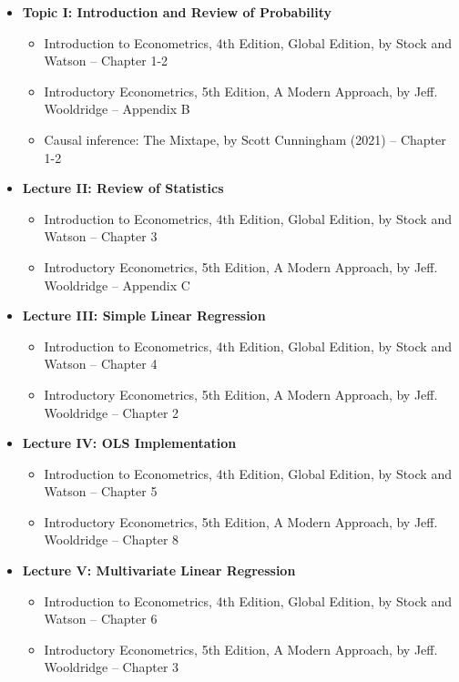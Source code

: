 \documentclass[12pt]{article}
\begin{document}
\begin{itemize}
    \item \textbf{Topic I: Introduction and Review of Probability}
    \begin{itemize}
        \item Introduction to Econometrics, 4th Edition, Global Edition, by Stock and Watson -- Chapter 1-2
        \item Introductory Econometrics, 5th Edition, A Modern Approach, by Jeff. Wooldridge -- Appendix B
        \item  Causal inference: The Mixtape, by Scott Cunningham (2021) -- Chapter 1-2

    \end{itemize}

    \item \textbf{Lecture II: Review of Statistics}
    \begin{itemize}
        \item Introduction to Econometrics, 4th Edition, Global Edition, by Stock and Watson -- Chapter 3
        \item Introductory Econometrics, 5th Edition, A Modern Approach, by Jeff. Wooldridge -- Appendix C\\[1em]
    \end{itemize}
    
    \item \textbf{Lecture III: Simple Linear Regression}
    \begin{itemize}
        \item Introduction to Econometrics, 4th Edition, Global Edition, by Stock and Watson -- Chapter 4
        \item Introductory Econometrics, 5th Edition, A Modern Approach, by Jeff. Wooldridge -- Chapter 2
    \end{itemize}
    
    \item \textbf{Lecture IV: OLS Implementation}
    \begin{itemize}
        \item Introduction to Econometrics, 4th Edition, Global Edition, by Stock and Watson -- Chapter 5
        \item Introductory Econometrics, 5th Edition, A Modern Approach, by Jeff. Wooldridge -- Chapter 8
    \end{itemize}
    
     \item \textbf{Lecture V: Multivariate Linear Regression}
     \begin{itemize}
        \item Introduction to Econometrics, 4th Edition, Global Edition, by Stock and Watson -- Chapter 6
        \item Introductory Econometrics, 5th Edition, A Modern Approach, by Jeff. Wooldridge -- Chapter 3
    \end{itemize}
    

\end{itemize}
\end{document}
